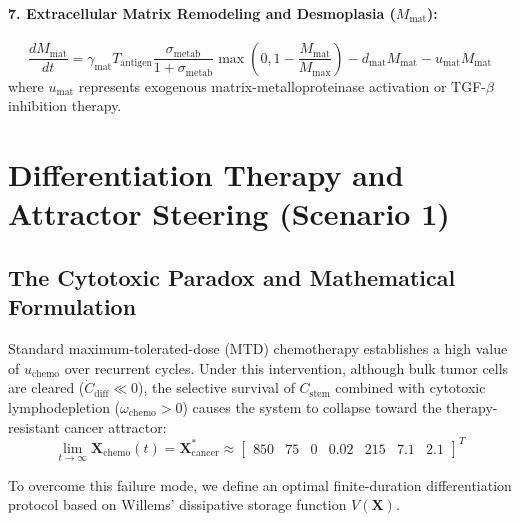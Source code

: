 \documentclass[11pt,a4paper]{article}
\begin{document}
\paragraph{7. Extracellular Matrix Remodeling and Desmoplasia ($M_{\mathrm{mat}}$):}
\begin{equation}
\frac{d M_{\mathrm{mat}}}{dt} = \gamma_{\mathrm{mat}} T_{\mathrm{antigen}} \frac{\sigma_{\mathrm{metab}}}{1 + \sigma_{\mathrm{metab}}} \max\left(0, 1 - \frac{M_{\mathrm{mat}}}{M_{\max}}\right) - d_{\mathrm{mat}} M_{\mathrm{mat}} - u_{\mathrm{mat}} M_{\mathrm{mat}}
\end{equation}
where $u_{\mathrm{mat}}$ represents exogenous matrix-metalloproteinase activation or TGF-$\beta$ inhibition therapy.

\section{Differentiation Therapy and Attractor Steering (Scenario 1)}

\subsection{The Cytotoxic Paradox and Mathematical Formulation}

Standard maximum-tolerated-dose (MTD) chemotherapy establishes a high value of $u_{\mathrm{chemo}}$ over recurrent cycles. Under this intervention, although bulk tumor cells are cleared ($\dot{C}_{\mathrm{diff}} \ll 0$), the selective survival of $C_{\mathrm{stem}}$ combined with cytotoxic lymphodepletion ($\omega_{\mathrm{chemo}} > 0$) causes the system to collapse toward the therapy-resistant cancer attractor:
\begin{equation}
\lim_{t \to \infty} \bm{X}_{\mathrm{chemo}}(t) = \bm{X}^*_{\mathrm{cancer}} \approx \begin{bmatrix} 850 & 75 & 0 & 0.02 & 215 & 7.1 & 2.1 \end{bmatrix}^T
\end{equation}

To overcome this failure mode, we define an optimal finite-duration differentiation protocol based on Willems' dissipative storage function $V(\bm{X})$.
\end{document}
